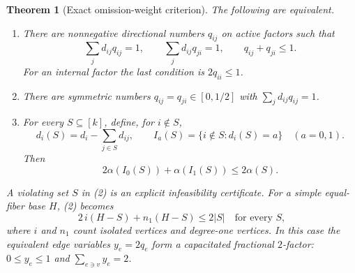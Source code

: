 \documentclass[11pt]{article}
\newtheorem{theorem}{Theorem}
\begin{document}
\begin{theorem}[Exact omission-weight criterion]\label{thm:lp}
The following are equivalent.
\begin{enumerate}
\item There are nonnegative directional numbers $q_{ij}$ on active
factors such that
\[
 \sum_jd_{ij}q_{ij}=1,\qquad
 \sum_jd_{ij}q_{ji}=1,\qquad q_{ij}+q_{ji}\leq1.       \tag{1}
\]
For an internal factor the last condition is $2q_{ii}\leq1$.
\item There are symmetric numbers $q_{ij}=q_{ji}\in[0,1/2]$
with $\sum_jd_{ij}q_{ij}=1$.
\item For every $S\subseteq[k]$, define, for $i\notin S$,
\[
 d_i(S)=d_i-\sum_{j\in S}d_{ij},\qquad
 I_a(S)=\{i\notin S:d_i(S)=a\}\quad(a=0,1).
\]
Then
\[
 2\alpha(I_0(S))+\alpha(I_1(S))\leq2\alpha(S).       \tag{2}
\]
\end{enumerate}
A violating set $S$ in (2) is an explicit infeasibility certificate.
For a simple equal-fiber base $H$, (2) becomes
\[
 2\,i(H-S)+n_1(H-S)\leq2|S|\quad\text{for every }S, \tag{3}
\]
where $i$ and $n_1$ count isolated vertices and degree-one vertices.
In this case the equivalent edge variables $y_e=2q_e$ form a
capacitated fractional $2$-factor:
$0\leq y_e\leq1$ and $\sum_{e\ni v}y_e=2$.
\end{theorem}
\end{document}
